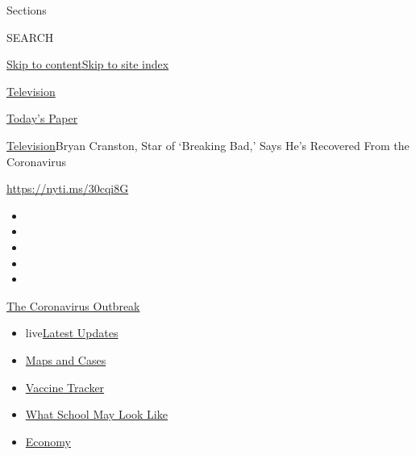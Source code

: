 Sections

SEARCH

\protect\hyperlink{site-content}{Skip to
content}\protect\hyperlink{site-index}{Skip to site index}

\href{https://www.nytimes3xbfgragh.onion/section/arts/television}{Television}

\href{https://myaccount.nytimes3xbfgragh.onion/auth/login?response_type=cookie\&client_id=vi}{}

\href{https://www.nytimes3xbfgragh.onion/section/todayspaper}{Today's
Paper}

\href{/section/arts/television}{Television}\textbar{}Bryan Cranston,
Star of `Breaking Bad,' Says He's Recovered From the Coronavirus

\url{https://nyti.ms/30cqi8G}

\begin{itemize}
\item
\item
\item
\item
\item
\end{itemize}

\href{https://www.nytimes3xbfgragh.onion/news-event/coronavirus?action=click\&pgtype=Article\&state=default\&region=TOP_BANNER\&context=storylines_menu}{The
Coronavirus Outbreak}

\begin{itemize}
\tightlist
\item
  live\href{https://www.nytimes3xbfgragh.onion/2020/08/01/world/coronavirus-covid-19.html?action=click\&pgtype=Article\&state=default\&region=TOP_BANNER\&context=storylines_menu}{Latest
  Updates}
\item
  \href{https://www.nytimes3xbfgragh.onion/interactive/2020/us/coronavirus-us-cases.html?action=click\&pgtype=Article\&state=default\&region=TOP_BANNER\&context=storylines_menu}{Maps
  and Cases}
\item
  \href{https://www.nytimes3xbfgragh.onion/interactive/2020/science/coronavirus-vaccine-tracker.html?action=click\&pgtype=Article\&state=default\&region=TOP_BANNER\&context=storylines_menu}{Vaccine
  Tracker}
\item
  \href{https://www.nytimes3xbfgragh.onion/interactive/2020/07/29/us/schools-reopening-coronavirus.html?action=click\&pgtype=Article\&state=default\&region=TOP_BANNER\&context=storylines_menu}{What
  School May Look Like}
\item
  \href{https://www.nytimes3xbfgragh.onion/live/2020/07/31/business/stock-market-today-coronavirus?action=click\&pgtype=Article\&state=default\&region=TOP_BANNER\&context=storylines_menu}{Economy}
\end{itemize}

